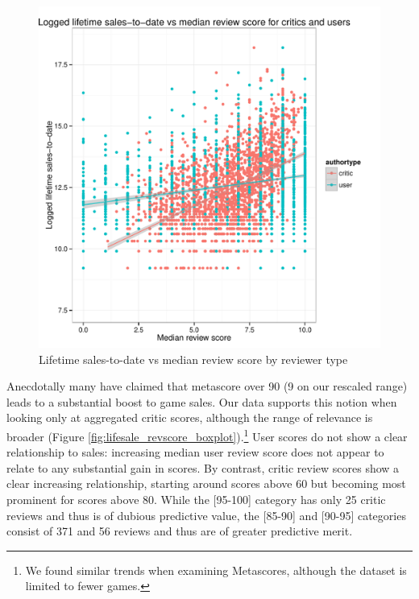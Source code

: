 \documentclass[letterpaper]{article}
\begin{document}
\begin{figure}[tbph]
\centering
\includegraphics[width=\linewidth]{./sales_medianscore_total}
\caption{Lifetime sales-to-date vs median review score by reviewer type}
\label{fig:lifesale_revscore}
\end{figure}

Anecdotally many have claimed that metascore over 90 (9 on our rescaled range) leads to a substantial boost to game sales. Our data supports this notion when looking only at aggregated critic scores, although the range of relevance is broader (Figure \ref{fig:lifesale_revscore_boxplot}).\footnote{We found similar trends when examining Metascores, although the dataset is limited to fewer games.} User scores do not show a clear relationship to sales: increasing median user review score does not appear to relate to any substantial gain in scores. By contrast, critic review scores show a clear increasing relationship, starting around scores above 60 but becoming most prominent for scores above 80. While the [95-100] category has only 25 critic reviews and thus is of dubious predictive value, the [85-90] and [90-95] categories consist of 371 and 56 reviews and thus are of greater predictive merit.
\end{document}
